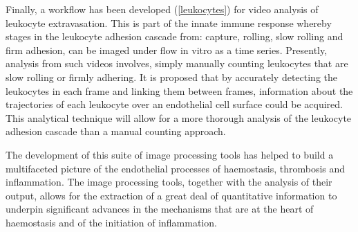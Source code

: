Finally, a workflow has been developed (\autoref{leukocytes}) for video analysis of leukocyte extravasation. This is part of the innate immune response whereby stages in the leukocyte adhesion cascade from: capture, rolling, slow rolling and firm adhesion, can be imaged under flow in vitro as a time series. Presently, analysis from such videos involves, simply manually counting leukocytes that are slow rolling or firmly adhering. It is proposed that by accurately detecting the leukocytes in each frame and linking them between frames, information about the trajectories of each leukocyte over an endothelial cell surface could be acquired. This analytical technique will allow for a more thorough analysis of the leukocyte adhesion cascade than a manual counting approach.

The development of this suite of image processing tools has helped to build a multifaceted picture of the endothelial processes of haemostasis, thrombosis and inflammation. The image processing tools, together with the analysis of their output, allows for the extraction of a great deal of quantitative information to underpin significant advances in the mechanisms that are at the heart of haemostasis and of the initiation of inflammation.
